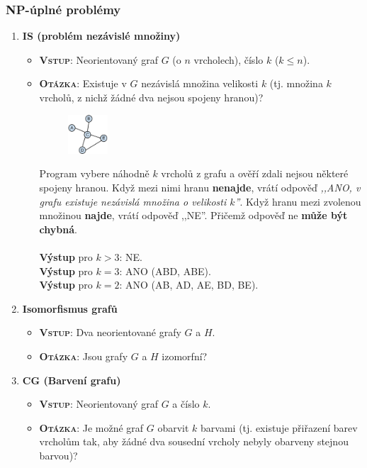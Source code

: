 \subsubsection{NP-úplné problémy}

\begin{enumerate}
	\item \textbf{IS (problém nezávislé množiny)}
	\begin{itemize}
		\item \textbf{\textsc{Vstup}}: Neorientovaný graf $G$ (o $n$ vrcholech), číslo $k$ ($k \leq n$).
		\item \textbf{\textsc{Otázka}}: Existuje v $G$ nezávislá množina velikosti $k$ (tj. množina $k$ vrcholů, z nichž žádné dva nejsou spojeny hranou)?
		\begin{figure}[H]
			\centering
			\includegraphics[width=0.15\textwidth]{assets/problem_is}
		\end{figure}
		Program vybere náhodně $k$ vrcholů z grafu a ověří zdali nejsou některé spojeny hranou. Když mezi nimi hranu \textbf{nenajde}, vrátí odpověď \textit{,,ANO, v grafu existuje nezávislá množina o velikosti $k$''}. Když hranu mezi zvolenou množinou \textbf{najde}, vrátí odpověď ,,NE''. Přičemž odpověď ne \textbf{může být chybná}.
		\\\\
		\textbf{Výstup} pro $k > 3$: NE.
\\
		\textbf{Výstup} pro $k = 3$: ANO (ABD, ABE).
\\
		\textbf{Výstup} pro $k = 2$: ANO (AB, AD, AE, BD, BE).
	\end{itemize}
	\item \textbf{Isomorfismus grafů}
	\begin{itemize}
		\item \textbf{\textsc{Vstup}}: Dva neorientované grafy $ G $ a $ H $.
		\item \textbf{\textsc{Otázka}}: Jsou grafy $ G $ a $ H $ izomorfní?
	\end{itemize}
	\item \textbf{CG (Barvení grafu)}
	\begin{itemize}
		\item \textbf{\textsc{Vstup}}: Neorientovaný graf $ G $ a číslo $ k $.
		\item \textbf{\textsc{Otázka}}: Je možné graf $ G $ obarvit $ k $ barvami (tj. existuje přiřazení barev vrcholům tak, aby žádné dva sousední vrcholy nebyly obarveny stejnou barvou)?

\end{itemize}
\end{enumerate}
